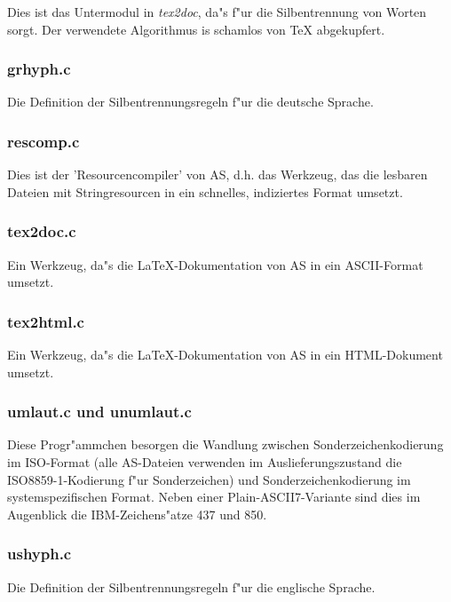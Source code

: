 \documentclass[12pt,a4paper,twoside]{report}
\newcommand{\asname}{AS}
\begin{document}
Dies ist das Untermodul in {\em tex2doc}, da"s f"ur die Silbentrennung von
Worten sorgt.  Der verwendete Algorithmus is schamlos von TeX
abgekupfert.

\subsubsection{grhyph.c}

Die Definition der Silbentrennungsregeln f"ur die deutsche Sprache.

\subsubsection{rescomp.c}

Dies ist der 'Resourcencompiler' von \asname{}, d.h. das Werkzeug, das die
lesbaren Dateien mit Stringresourcen in ein schnelles, indiziertes Format
umsetzt.

\subsubsection{tex2doc.c}

Ein Werkzeug, da"s die LaTeX-Dokumentation von \asname{} in ein ASCII-Format
umsetzt.

\subsubsection{tex2html.c}

Ein Werkzeug, da"s die LaTeX-Dokumentation von \asname{} in ein HTML-Dokument
umsetzt.

\subsubsection{umlaut.c und unumlaut.c}

Diese Progr"ammchen besorgen die Wandlung zwischen Sonderzeichenkodierung
im ISO-Format (alle \asname{}-Dateien verwenden im Auslieferungszustand die
ISO8859-1-Kodierung f"ur Sonderzeichen) und Sonderzeichenkodierung im
systemspezifischen Format.  Neben einer Plain-ASCII7-Variante sind dies im
Augenblick die IBM-Zeichens"atze 437 und 850.

\subsubsection{ushyph.c}

Die Definition der Silbentrennungsregeln f"ur die englische Sprache.
\end{document}
